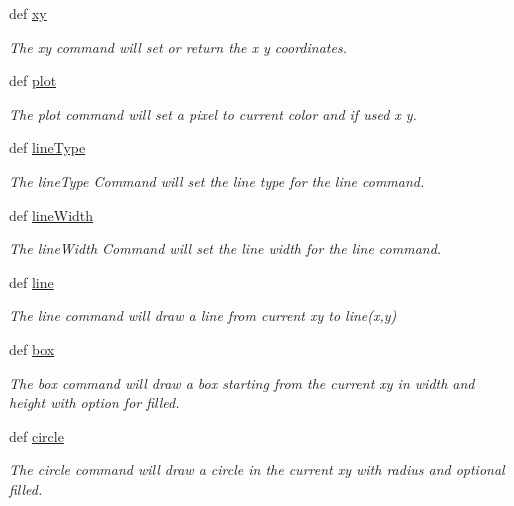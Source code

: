 \begin{DoxyCompactItemize}
def \hyperlink{group___drawing_ga93fdd029cb3a4fd28f006d9dac12de14}{xy}
\begin{DoxyCompactList}\small\item\em The xy command will set or return the x y coordinates. \end{DoxyCompactList}\item 
def \hyperlink{group___drawing_gaad72ea59743ea85183832ede89d9eb22}{plot}
\begin{DoxyCompactList}\small\item\em The plot command will set a pixel to current color and if used x y. \end{DoxyCompactList}\item 
def \hyperlink{group___drawing_gafbc7a80b227e1e7d9fb6a587a63aaba3}{line\-Type}
\begin{DoxyCompactList}\small\item\em The line\-Type Command will set the line type for the line command. \end{DoxyCompactList}\item 
def \hyperlink{group___drawing_ga4a128e755251c2605c984110eb056fad}{line\-Width}
\begin{DoxyCompactList}\small\item\em The line\-Width Command will set the line width for the line command. \end{DoxyCompactList}\item 
def \hyperlink{group___drawing_ga4ea7514be57c8e20f3d15fa14cf2ddf4}{line}
\begin{DoxyCompactList}\small\item\em The line command will draw a line from current xy to line(x,y) \end{DoxyCompactList}\item 
def \hyperlink{group___drawing_gad107700161c2d7c46ed973ada854c9a0}{box}
\begin{DoxyCompactList}\small\item\em The box command will draw a box starting from the current xy in width and height with option for filled. \end{DoxyCompactList}\item 
def \hyperlink{group___drawing_ga5820b906de6cabef82914dfab0c543e2}{circle}
\begin{DoxyCompactList}\small\item\em The circle command will draw a circle in the current xy with radius and optional filled. \end{DoxyCompactList}\item 

\end{DoxyCompactItemize}
